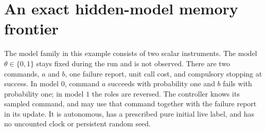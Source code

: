 \section{An exact hidden-model memory frontier}\label{sec:r79-exact-hidden}

The model family in this example consists of two scalar instruments.
The model $\theta\in\{0,1\}$ stays fixed during the run and is not observed.
There are two commands, $a$ and $b$, one failure report, unit call cost,
and compulsory stopping at success.  In model $0$, command $a$ succeeds
with probability one and $b$ fails with probability one; in model $1$
the roles are reversed.  The controller knows its sampled command,
and may use that command together with the failure report in its update.
It is autonomous, has a prescribed pure initial live label, and has no
uncounted clock or persistent random seed.

